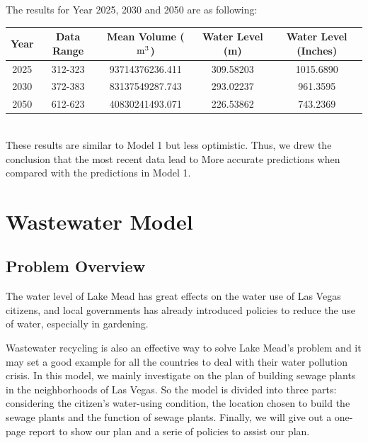 \documentclass[12pt]{article}
\theoremstyle{definition}
\theoremstyle{remark}
\numberwithin{equation}{section}
\begin{document}
		The results for Year 2025, 2030 and 2050 are as following:
		~\\
		\begin{center}
		\begin{tabular}{ccccc}
			\hline
			Year&Data Range&Mean Volume ($\rm{m^3}$)&Water Level (m)&Water Level (Inches)\\
			\hline
			2025&312-323&93714376236.411&309.58203&1015.6890\\
			2030&372-383&83137549287.743&293.02237&961.3595\\
			2050&612-623&40830241493.071&226.53862&743.2369\\
			\hline
		\end{tabular}
		\end{center}
		~\\

		These results are similar to Model 1 but less optimistic. Thus, we drew the conclusion that the most recent data lead to More accurate predictions when compared with the predictions in Model 1.

\newpage
\section{Wastewater Model}
	\subsection{Problem Overview}
		The water level of Lake Mead has great effects on the water use of Las Vegas citizens, and local governments has already introduced policies to reduce the use of water, especially in gardening. \cite{Actions Taken}

		Wastewater recycling is also an effective way to solve Lake Mead's problem and it may set a good example for all the countries to deal with their water pollution crisis. In this model, we mainly investigate on the plan of building sewage plants in the neighborhoods of Las Vegas. So the model is divided into three parts: considering the citizen's water-using condition, the location chosen to build the sewage plants and the function of sewage plants. Finally, we will give out a one-page report to show our plan and a serie of  policies to assist our plan.
\end{document}
